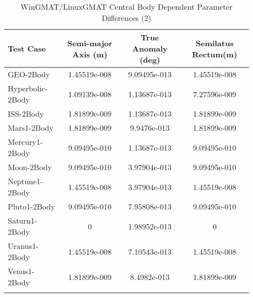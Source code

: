 \begin{table}[htbp!]
\centering
\caption{ WinGMAT/LinuxGMAT Central Body Dependent Parameter Differences (2)}
      \begin{tabular}{lccc}
      \hline\hline
          Test Case & Semi-major Axis (m) & True Anomaly (deg) & Semilatus Rectum(m) \\
         \hline
         GEO-2Body & 1.45519e-008 & 9.09495e-013 & 1.45519e-008 \\
         Hyperbolic-2Body & 1.09139e-008 & 1.13687e-013 & 7.27596e-009 \\
         ISS-2Body & 1.81899e-009 & 1.13687e-013 & 1.81899e-009 \\
         Mars1-2Body & 1.81899e-009 & 9.9476e-013 & 1.81899e-009 \\
         Mercury1-2Body & 9.09495e-010 & 1.13687e-013 & 9.09495e-010 \\
         Moon-2Body & 9.09495e-010 & 3.97904e-013 & 9.09495e-010 \\
         Neptune1-2Body & 1.45519e-008 & 3.97904e-013 & 1.45519e-008 \\
         Pluto1-2Body & 9.09495e-010 & 7.95808e-013 & 9.09495e-010 \\
         Saturn1-2Body & 0 & 1.98952e-013 & 0 \\
         Uranus1-2Body & 1.45519e-008 & 7.10543e-013 & 1.45519e-008 \\
         Venus1-2Body & 1.81899e-009 & 8.4982e-013 & 1.81899e-009 \\
      \hline\hline
      \label{Table: WinGMAT-LinuxGMAT CB Parameters Set 2} 
\end{tabular}
\end{table}

